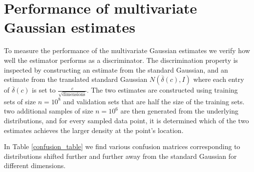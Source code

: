 \documentclass{report}
\begin{document}
\section{Performance of multivariate Gaussian estimates}
To measure the performance of the multivariate Gaussian estimates we verify how well the estimator performs
as a discriminator. The discrimination property is inspected by constructing an estimate from the
standard Gaussian, and an estimate from the translated standard Gaussian $N(\overline{\delta}(c), I)$ where each entry of $\overline{\delta}(c)$ is set to $\frac{c}{\sqrt{\text{dimensions}}}$. The two estimates 
are constructed using training sets of size $n=10^8$ and validation sets that are half the size of the training sets. two additional samples of size $n=10^6$ are then generated from the underlying
distributions, and for every sampled data point, it is determined which of the two estimates achieves the
larger density at the point's location.

In Table \ref{confusion_table} we find various confusion matrices corresponding to distributions shifted
further and further away from the standard Gaussian for different dimensions. 
\end{document}
